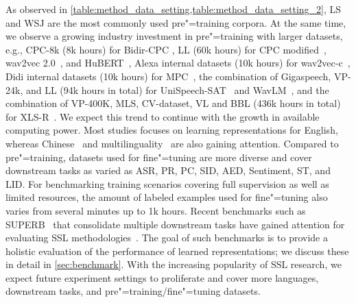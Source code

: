 As observed in \cref{table:method_data_setting,table:method_data_setting_2}, LS and WSJ are the most commonly used
pre"=training corpora. At the same time, we observe a
growing industry investment in pre"=training with larger datasets, e.g.,
CPC-8k (8k hours) for Bidir-CPC \parencite{kawakami_learning_2020}, LL (60k hours) for
CPC modified~\parencite{riviere_unsupervised_2020}, 
wav2vec 2.0~\parencite{baevski_wav2vec_2020}, and HuBERT~\parencite{hsu_hubert_2021}, Alexa internal
datasets (10k hours) for wav2vec-c~\parencite{sadhu_wav2vecc_2021}, Didi internal
datasets (10k hours) for MPC~\parencite{jiang_improving_2019, jiang_further_2021}, the
combination of Gigaspeech, VP-24k, and LL (94k hours in total) for
UniSpeech-SAT~\parencite{chen_unispeechsat_2021} and WavLM~\parencite{chen_wavlm_2021}, and
the combination of VP-400K, MLS, CV-dataset, VL and BBL (436k hours in total)
for XLS-R~\parencite{babu_xlsr_2021}. We expect this trend to continue with the growth
in available computing power. Most studies focuses on learning representations
for English, whereas Chinese~\parencite{jiang_improving_2019, jiang_further_2021} and
multilinguality~\parencite{kawakami_learning_2020, babu_xlsr_2021} are also gaining
attention. Compared to pre"=training, datasets used for fine"=tuning are more
diverse and cover downstream tasks as varied as ASR, PR, PC, SID, AED,
Sentiment, ST, and LID. For benchmarking training scenarios covering full
supervision as well as limited resources, the amount of labeled examples used for
fine"=tuning also varies from several minutes up to 1k hours. Recent
benchmarks such as SUPERB~\parencite{yang_superb_2021} that consolidate multiple 
downstream tasks have gained attention for evaluating SSL
methodologies~\parencite{chen_unispeechsat_2021, chen_wavlm_2021}. The goal of such benchmarks is
to provide a holistic evaluation of the performance of learned representations; 
we discuss these in detail in \cref{sec:benchmark}. With the increasing
popularity of SSL research, we expect future experiment settings to proliferate
and cover more languages, downstream tasks, and pre"=training/fine"=tuning
datasets.


